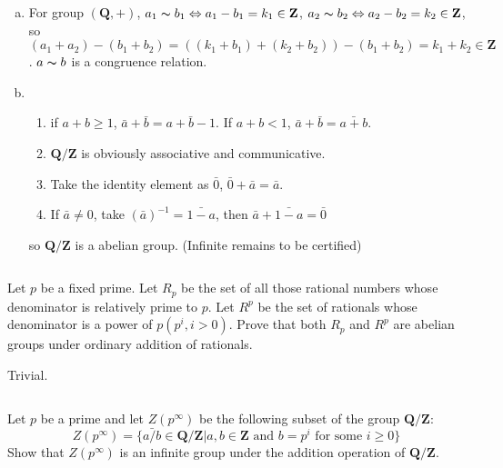 \begin{answer}
    \begin{enumerate}[(a)]
        \item For group $(\mathbf{Q}, +)$, $a_1\thicksim b_1\Leftrightarrow a_1-b_1=k_1\in \mathbf{Z}$, $a_2\thicksim b_2\Leftrightarrow a_2-b_2=k_2\in \mathbf{Z}$, so $(a_1+a_2)-(b_1+b_2)=((k_1+b_1)+(k_2+b_2))-(b_1+b_2)=k_1+k_2\in\mathbf{Z}$. $a\thicksim b$ is a congruence relation.
        \item \begin{enumerate}[1]
            \item if $a+b\geq 1$, $\bar{a}+\bar{b}=\bar{a+b-1}$. If $a+b<1$, $\bar{a}+\bar{b}=\bar{a+b}$.
            \item $\mathbf{Q}/\mathbf{Z}$ is obviously associative and communicative.
            \item Take the identity element as $\bar{0}$, $\bar{0}+\bar{a}=\bar{a}$.
            \item If $\bar{a}\neq 0$, take $(\bar{a})^{-1}=\bar{1-a}$, then $\bar{a}+\bar{1-a}=\bar{0}$
        \end{enumerate}
        so $\mathbf{Q}/\mathbf{Z}$ is a abelian group. (Infinite remains to be certified)
    \end{enumerate}
\end{answer}

$$ $$

\begin{ex}
    Let $p$ be a fixed prime. Let $R_p$ be the set of all those rational numbers whose denominator is relatively prime to $p$. Let $R^p$ be the set of rationals whose denominator is a power of $p (p^i, i > 0)$. Prove that both $R_p$ and $R^p$ are abelian groups under ordinary addition of rationals.
\end{ex}

\begin{answer}
    Trivial.
\end{answer}

$$ $$

\begin{ex}
    Let $p$ be a prime and let $Z(p^\infty)$ be the following subset of the group $\mathbf{Q}/\mathbf{Z}$:\[Z(p^\infty)=\{\bar{a/b}\in\mathbf{Q}/\mathbf{Z}| a,b \in \mathbf{Z} \text{ and } b=p^i \text{ for some }i\geq 0\}\]
    Show that $Z(p^\infty)$ is an infinite group under the addition operation of $\mathbf{Q}/\mathbf{Z}$.
\end{ex}

